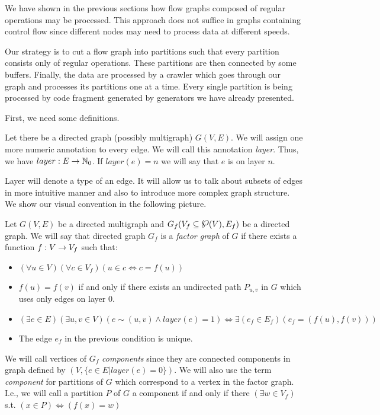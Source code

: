 
\label{sec:partitioning}

We have shown in the previous sections how flow graphs composed of regular operations may be processed. This approach does not suffice in graphs containing control flow since different nodes may need to process data at different speeds. 

Our strategy is to cut a flow graph into partitions such that every partition consists only of regular operations. These partitions are then connected by some buffers. Finally, the data are processed by a crawler which  goes through our graph and processes its partitions one at a time. Every single partition is being processed by code fragment generated by generators we have already presented. 

First, we need some definitions.

  Let there be a directed graph (possibly multigraph) $G(V,E)$. We will assign one more numeric annotation to every edge. We will call this annotation \emph{layer}. Thus, we have $layer: E \rightarrow \mathbb{N}_0$. If $layer(e) = n$ we will say that $e$ is on layer $n$. 
\myenddef

Layer will denote a type of an edge. It will allow us to talk about subsets of edges in more intuitive manner and also to introduce more complex graph structure. We show our visual convention in the following picture.


  Let $G(V,E)$ be a directed multigraph and $G_f(V_f \subseteq \powerset(V),E_f)$ be a directed graph. We will say that directed graph $G_f$ is a \emph{factor graph} of $G$ if there exists a function $f: V \rightarrow V_f$ such that:
  \begin{itemize}
    \item $(\forall u \in V)(\forall c \in V_f)( u \in c \Longleftrightarrow c = f(u)) $
    \item $f(u) = f(v)$ if and only if there exists an undirected path $P_{u,v}$ in $G$ which uses only edges on layer 0.
    \item $(\exists e \in E)(\exists u,v \in V)(e \sim (u,v) \land layer(e) = 1) \Longleftrightarrow \exists(e_f \in E_f)( e_f = (f(u), f(v)) )$  
    \item The edge $e_f$ in the previous condition is unique.
  \end{itemize}
  We will call vertices of $G_f$ \emph{components} since they are connected components in graph defined by $(V, \{e \in E | layer(e) = 0 \})$. We will also use the term \emph{component} for partitions of $G$ which correspond to a vertex in the factor graph. I.e., we will call a partition $P$ of $G$ a component if and only if there $(\exists w \in V_f)$ s.t. $(x \in P) \Longleftrightarrow ( f(x) = w)$
\myenddef

